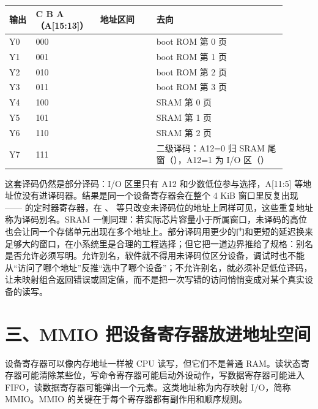 
\begin{longtable}{L{0.09\linewidth}L{0.18\linewidth}L{0.19\linewidth}L{0.44\linewidth}}
\toprule
输出 & C B A（A[15:13]） & 地址区间 & 去向 \\
\midrule
Y0 & 000 &  & boot ROM 第 0 页 \\
Y1 & 001 &  & boot ROM 第 1 页 \\
Y2 & 010 &  & boot ROM 第 2 页 \\
Y3 & 011 &  & boot ROM 第 3 页 \\
Y4 & 100 &  & SRAM 第 0 页 \\
Y5 & 101 &  & SRAM 第 1 页 \\
Y6 & 110 &  & SRAM 第 2 页 \\
Y7 & 111 &  & 二级译码：A12=0 归 SRAM 尾窗（），A12=1 为 I/O 区（） \\
\bottomrule
\end{longtable}

这套译码仍然是部分译码：I/O 区里只有 A12 和少数低位参与选择，A[11:5] 等地址位没有进译码器。结果是同一个设备寄存器会在整个 4 KiB 窗口里反复出现—— 的定时器寄存器，在 、 等只改变未译码位的地址上同样可见，这些重复地址称为译码别名。SRAM 一侧同理：若实际芯片容量小于所属窗口，未译码的高位也会让同一个存储单元出现在多个地址上。部分译码用更少的门和更短的延迟换来足够大的窗口，在小系统里是合理的工程选择；但它把一道边界推给了规格：别名是否允许必须写明。允许别名，软件就不得用未译码位区分设备，调试时也不能从“访问了哪个地址”反推“选中了哪个设备”；不允许别名，就必须补足低位译码，让未映射组合返回错误或固定值，而不是把一次写错的访问悄悄变成对某个真实设备的读写。

\section{三、MMIO 把设备寄存器放进地址空间}

设备寄存器可以像内存地址一样被 CPU 读写，但它们不是普通 RAM。读状态寄存器可能清除某些位，写命令寄存器可能启动外设动作，写数据寄存器可能进入 FIFO，读数据寄存器可能弹出一个元素。这类地址称为内存映射 I/O，简称 MMIO。MMIO 的关键在于每个寄存器都有副作用和顺序规则。


